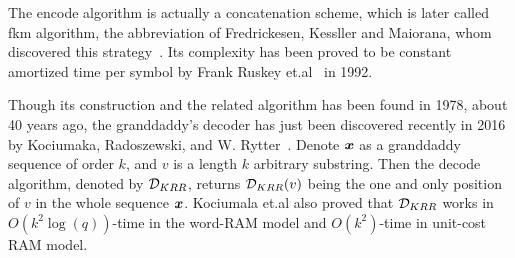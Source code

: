 The encode algorithm is actually a concatenation scheme, which is later called \gls{fkm} algorithm, the abbreviation of Fredrickesen, Kessller and Maiorana, whom discovered this strategy~\cite{fredricksen1978necklaces,fredricksen1986algorithm}. Its complexity has been proved to be constant amortized time per symbol by Frank Ruskey et.al~\cite{ruskey1992generating} in 1992.

Though its construction and the related algorithm has been found in 1978, about 40 years ago, the granddaddy's decoder has just been discovered recently in 2016 by Kociumaka, Radoszewski, and W. Rytter~\cite{kociumaka2016efficient}. Denote ${\boldsymbol x}$ as a granddaddy sequence of order $k$, and $v$ is a length $k$ arbitrary substring. Then the decode algorithm, denoted by ${\cal D}_{KRR}$, returns ${\cal D}_{KRR}(v)$ being the one and only position of $v$ in the whole sequence ${\boldsymbol x}$. Kociumala et.al also proved that ${\cal D}_{KRR}$ works in $O(k^2\log(q))$-time in the word-RAM model and $O(k^{2})$-time in unit-cost RAM model.